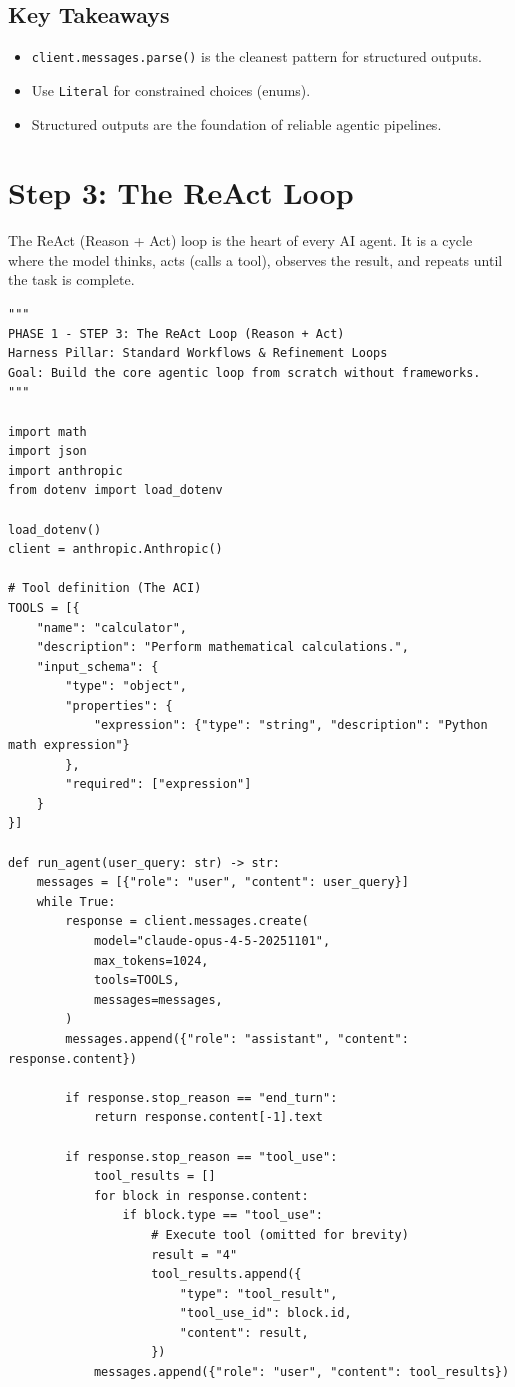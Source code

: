 \subsection*{Key Takeaways}
\begin{itemize}
    \item \texttt{client.messages.parse()} is the cleanest pattern for structured outputs.
    \item Use \texttt{Literal} for constrained choices (enums).
    \item Structured outputs are the foundation of reliable agentic pipelines.
\end{itemize}

\section{Step 3: The ReAct Loop}
The ReAct (Reason + Act) loop is the heart of every AI agent. It is a cycle where the model thinks, acts (calls a tool), observes the result, and repeats until the task is complete.

\begin{lstlisting}[caption={step3\_react\_loop.py}, label={lst:step3}]
"""
PHASE 1 - STEP 3: The ReAct Loop (Reason + Act)
Harness Pillar: Standard Workflows & Refinement Loops
Goal: Build the core agentic loop from scratch without frameworks.
"""

import math
import json
import anthropic
from dotenv import load_dotenv

load_dotenv()
client = anthropic.Anthropic()

# Tool definition (The ACI)
TOOLS = [{
    "name": "calculator",
    "description": "Perform mathematical calculations.",
    "input_schema": {
        "type": "object",
        "properties": {
            "expression": {"type": "string", "description": "Python math expression"}
        },
        "required": ["expression"]
    }
}]

def run_agent(user_query: str) -> str:
    messages = [{"role": "user", "content": user_query}]
    while True:
        response = client.messages.create(
            model="claude-opus-4-5-20251101",
            max_tokens=1024,
            tools=TOOLS,
            messages=messages,
        )
        messages.append({"role": "assistant", "content": response.content})

        if response.stop_reason == "end_turn":
            return response.content[-1].text

        if response.stop_reason == "tool_use":
            tool_results = []
            for block in response.content:
                if block.type == "tool_use":
                    # Execute tool (omitted for brevity)
                    result = "4" 
                    tool_results.append({
                        "type": "tool_result",
                        "tool_use_id": block.id,
                        "content": result,
                    })
            messages.append({"role": "user", "content": tool_results})
\end{lstlisting}

